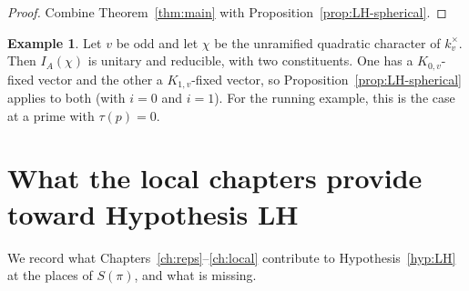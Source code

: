 \documentclass[12pt,letterpaper]{book}
\theoremstyle{plain}
\theoremstyle{definition}
\newtheorem{example}[theorem]{Example}
\theoremstyle{remark}
\theoremstyle{remark}
\begin{document}
\begin{proof} Combine Theorem~\ref{thm:main} with
Proposition~\ref{prop:LH-spherical}.
\end{proof}

\begin{example}
Let $v$ be odd and let $\chi$ be the unramified quadratic character of
$k_v^\times$. Then $I_A(\chi)$ is unitary and reducible, with two
constituents. One has a $K_{0,v}$-fixed vector and the other a
$K_{1,v}$-fixed vector, so Proposition~\ref{prop:LH-spherical} applies to
both (with $i=0$ and $i=1$). For the running example, this is the case at
a prime with $\tau(p)=0$.
\end{example}

\section{What the local chapters provide toward Hypothesis LH}
\label{sec:LH-status}

We record what Chapters~\ref{ch:reps}--\ref{ch:local} contribute to
Hypothesis~\ref{hyp:LH} at the places of $S(\pi)$, and what is missing.
\end{document}
